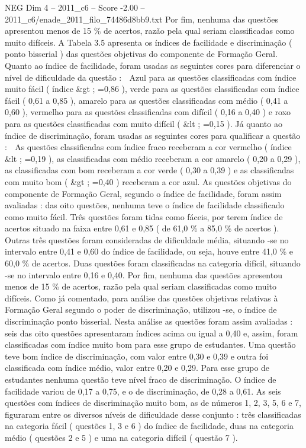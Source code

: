 \begin{textsample}{NEG Dim 4 – 2011\_c6 – Score -2.00 – 2011\_c6/enade\_2011\_filo\_74486d8bb9.txt}
Por fim, nenhuma das questões apresentou menos de 15 \% de acertos, razão pela qual seriam classificadas como muito difíceis.
A Tabela 3.5 apresenta os índices de facilidade e discriminação ( ponto bisserial ) das questões objetivas do componente de Formação Geral.
Quanto ao índice de facilidade, foram usadas as seguintes cores para diferenciar o nível de dificuldade da questão :  Azul para as questões classificadas com índice muito fácil ( índice \&gt ; =0,86 ), verde para as questões classificadas com índice fácil ( 0,61 a 0,85 ), amarelo para as questões classificadas com médio ( 0,41 a 0,60 ), vermelho para as questões classificadas com difícil ( 0,16 a 0,40 ) e roxo para as questões classificadas com muito difícil ( \&lt ; =0,15 ).
Já quanto ao índice de discriminação, foram usadas as seguintes cores para qualificar a questão :  As questões classificadas com índice fraco receberam a cor vermelho ( índice \&lt ; =0,19 ), as classificadas com médio receberam a cor amarelo ( 0,20 a 0,29 ), as classificadas com bom receberam a cor verde ( 0,30 a 0,39 ) e as classificadas com muito bom ( \&gt ; =0,40 ) receberam a cor azul.
As questões objetivas do componente de Formação Geral, segundo o índice de facilidade, foram assim avaliadas : das oito questões, nenhuma teve o índice de facilidade classificado como muito fácil.
Três questões foram tidas como fáceis, por terem índice de acertos situado na faixa entre 0,61 e 0,85 ( de 61,0 \% a 85,0 \% de acertos ).
Outras três questões foram consideradas de dificuldade média, situando -se no intervalo entre 0,41 e 0,60 do índice de facilidade, ou seja, houve entre 41,0 \% e 60,0 \% de acertos.
Duas questões foram classificadas na categoria difícil, situando -se no intervalo entre 0,16 e 0,40.
Por fim, nenhuma das questões apresentou menos de 15 \% de acertos, razão pela qual seriam classificadas como muito difíceis.
Como já comentado, para análise das questões objetivas relativas à Formação Geral segundo o poder de discriminação, utilizou -se, o índice de discriminação ponto bisserial.
Nesta análise as questões foram assim avaliadas : seis das oito questões apresentaram índices acima ou igual a 0,40 e, assim, foram classificadas com índice muito bom para esse grupo de estudantes.
Uma questão teve bom índice de discriminação, com valor entre 0,30 e 0,39 e outra foi classificada com índice médio, valor entre 0,20 e 0,29.
Para esse grupo de estudantes nenhuma questão teve nível fraco de discriminação.
O índice de facilidade variou de 0,17 a 0,75, e o de discriminação, de 0,28 a 0,61.
As seis questões com índices de discriminação muito bom, as de números 1, 2, 3, 5, 6 e 7, figuraram entre os diversos níveis de dificuldade desse conjunto : três classificadas na categoria fácil ( questões 1, 3 e 6 ) do índice de facilidade, duas na categoria médio ( questões 2 e 5 ) e uma na categoria difícil ( questão 7 ).

\end{textsample}
